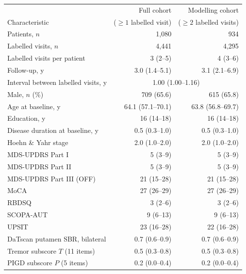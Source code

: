 \begin{tabular}{@{}lrr@{}}
\toprule
 & Full cohort & Modelling cohort \\
Characteristic & ($\geq 1$ labelled visit) & ($\geq 2$ labelled visits) \\
\midrule
Patients, $n$                               & 1,080 & 934 \\
Labelled visits, $n$                        & 4,441 & 4,295 \\
Labelled visits per patient                 & 3 (2--5) & 4 (3--6) \\
Follow-up, y                                & 3.0 (1.4--5.1) & 3.1 (2.1--6.9) \\
Interval between labelled visits, y         & \multicolumn{2}{c}{1.00 (1.00--1.16)} \\
\addlinespace[2pt]
Male, $n$ (\%)                              & 709 (65.6) & 615 (65.8) \\
Age at baseline, y                          & 64.1 (57.1--70.1) & 63.8 (56.8--69.7) \\
Education, y                                & 16 (14--18) & 16 (14--18) \\
Disease duration at baseline, y             & 0.5 (0.3--1.0) & 0.5 (0.3--1.0) \\
Hoehn \& Yahr stage                         & 2.0 (1.0--2.0) & 2.0 (1.0--2.0) \\
MDS-UPDRS Part I                            & 5 (3--9) & 5 (3--9) \\
MDS-UPDRS Part II                           & 5 (3--9) & 5 (3--9) \\
MDS-UPDRS Part III (OFF)                    & 21 (15--28) & 21 (15--28) \\
MoCA                                        & 27 (26--29) & 27 (26--29) \\
RBDSQ                                       & 3 (2--6) & 3 (2--6) \\
SCOPA-AUT                                   & 9 (6--13) & 9 (6--13) \\
UPSIT                                       & 23 (16--28) & 22 (16--28) \\
DaTscan putamen SBR, bilateral              & 0.7 (0.6--0.9) & 0.7 (0.6--0.9) \\
\addlinespace[2pt]
Tremor subscore $T$ (11 items)              & 0.5 (0.3--0.8) & 0.5 (0.3--0.8) \\
PIGD subscore $P$ (5 items)                 & 0.2 (0.0--0.4) & 0.2 (0.0--0.4) \\

\end{tabular}
